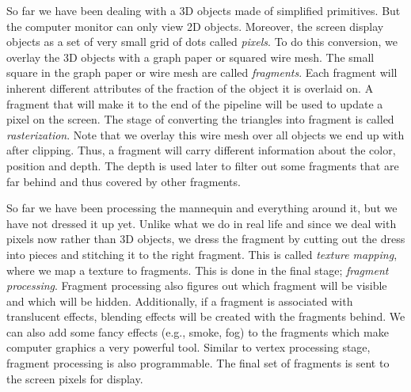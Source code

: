 \documentclass[12pt] {article}
\begin{document}
So far we have been dealing with a 3D objects made of simplified primitives. But the computer monitor can only view 2D objects. Moreover, the screen display objects as a set of very small grid of dots called \emph{pixels}. To do this conversion, we overlay the 3D objects with a graph paper or squared wire mesh. The small square in the graph paper or wire mesh are called \emph{fragments}. Each fragment will inherent different attributes of the fraction of the object it is overlaid on. A fragment that will make it to the end of the pipeline will be used to update a pixel on the screen. The stage of converting the triangles into fragment is called \emph{rasterization}. Note that we overlay this wire mesh over all objects we end up with after clipping. Thus, a fragment will carry different information about the color, position and depth. The depth is used later to filter out some fragments that are far behind and thus covered by other fragments.
 
So far we have been processing the mannequin and everything around it, but we have not dressed it up yet. Unlike what we do in real life and since we deal with pixels now rather than 3D objects, we dress the fragment by cutting out the dress into pieces and stitching it to the right fragment. This is called \emph{texture mapping}, where we map a texture to fragments. This is done in the final stage; \emph{fragment processing}. Fragment processing also figures out which fragment will be visible and which will be hidden. Additionally, if a fragment is associated with translucent effects, blending effects will be created with the fragments behind. We can also add some fancy effects (e.g., smoke, fog) to the fragments which make computer graphics a very powerful tool. Similar to vertex processing stage, fragment processing is also programmable. The final set of fragments is sent to the screen pixels for display. 





\end{document}
